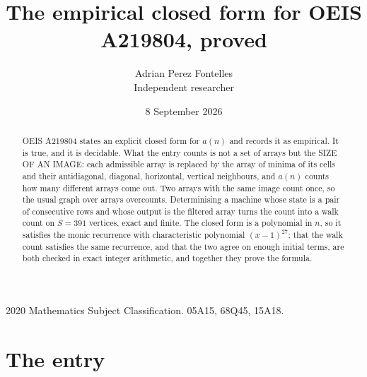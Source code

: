\documentclass[11pt,a4paper]{article}
\title{The empirical closed form for OEIS A219804, proved}
\author{Adrian Perez Fontelles\\ \small Independent researcher}
\date{8 September 2026}
\theoremstyle{plain}
\theoremstyle{definition}
\begin{document}
\maketitle

\begin{abstract}
OEIS A219804 states an explicit closed form for $a(n)$ and records it as empirical. It is true, and
it is decidable. What the entry counts is not a set of arrays but the SIZE OF AN IMAGE: each
admissible array is replaced by the array of minima of its cells and their antidiagonal, diagonal, horizontal, vertical neighbours,
and $a(n)$ counts how many different arrays come out. Two arrays with the same image count
once, so the usual graph over arrays overcounts. Determinising a machine whose state is a pair
of consecutive rows and whose output is the filtered array turns the count into a walk count on
$S=391$ vertices, exact and finite. The closed form is a polynomial in $n$, so it satisfies the
monic recurrence with characteristic polynomial $(x-1)^{27}$; that the walk count
satisfies the same recurrence, and that the two agree on enough initial terms, are both checked
in exact integer arithmetic, and together they prove the formula.
\end{abstract}

\noindent\small 2020 Mathematics Subject Classification. 05A15, 68Q45, 15A18.\normalsize

\section{The entry}
\end{document}
